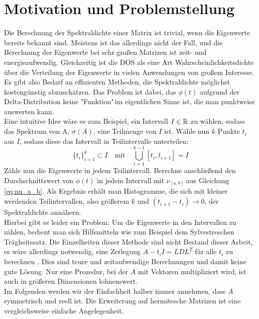 \section{Motivation und Problemstellung}
Die Berechnung der Spektraldichte einer Matrix ist trivial, wenn die Eigenwerte bereits bekannt sind.
Meistens ist das allerdings nicht der Fall,
und die Berechnung der Eigenwerte bei sehr großen Matrizen ist zeit- und energieaufwendig.
Gleichzeitig ist die DOS als eine Art Wahrscheinlichkeitsdichte über die Verteilung der Eigenwerte in vielen Anwendungen von großem Interesse.
Es gibt also Bedarf an effizienten Methoden,
die Spektraldichte möglichst kostengünstig abzuschätzen.
Das Problem ist dabei, das $\phi(t)$ aufgrund der Delta-Distribution keine "Funktion"\,im eigentlichen Sinne ist,
die man punktweise auswerten kann.\\
Eine intuitive Idee wäre es zum Beispiel,
ein Intervall $I \in \mathbb{R}$ zu wählen, sodass das Spektrum von A, $\sigma(A)$, eine Teilmenge von $I$ ist.
Wähle nun $k$ Punkte $t_i$ aus $I$, sodass diese das Intervall in Teilintervalle unterteilen:
$$\{t_i\}_{i = 1}^k \subset I \quad \text{mit} \quad \bigcup_{i = 1}^{k - 1} [t_i, t_{i+1}] = I$$
Zähle nun die Eigenwerte in jedem Teilintervall.
Berechne anschließend den Durchschnittswert von $\phi(t)$ in jedem Intervall mit $\nu_{[a, b]}$ aus Gleichung \ref{eq:nu_a_b}.
Als Ergebnis erhält man Histogramme, die sich mit kleiner werdenden Teilintervallen, also größerem $k$ und $(t_{i+1} - t_i) \longrightarrow 0$, der Spektraldichte annähern.\\
Hierbei gibt es leider ein Problem:
Um die Eigenwerte in den Intervallen zu zählen, bedient man sich Hilfsmitteln wie zum Beispiel dem Sylvestreschen Trägheitssatz.
Die Einzelheiten dieser Methode sind nicht Bestand dieser Arbeit,
es wäre allerdings notwendig, eine Zerlegung $A - t_i I = LDL^T$ für alle $t_i$ zu berechnen \cite{golubvanloan}.
Dies sind teure und zeitaufwendige Berechnungen und damit keine gute Lösung.
Nur eine Prozedur, bei der $A$ mit Vektoren multipliziert wird, ist auch in größeren Dimensionen lohnenswert.\\
Im Folgenden werden wir der Einfachheit halber immer annehmen, dass $A$ symmetrisch und reell ist.
Die Erweiterung auf hermitesche Matrizen ist eine vergleichsweise einfache Angelegenheit.

